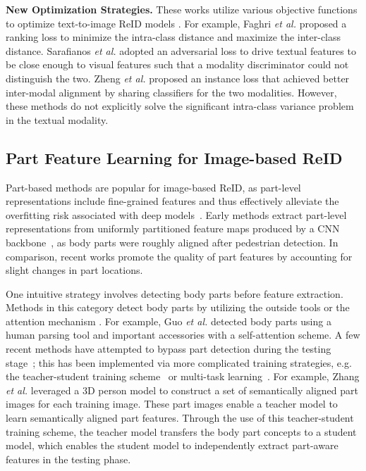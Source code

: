 \documentclass[journal]{IEEEtran}
\begin{document}
\textbf{New Optimization Strategies.} These works utilize various objective functions to optimize text-to-image ReID models \cite{li2017identity,faghri2017vse++,sarafianos2019adversarial,zhang2018deep,zheng2020dual,liu2019deep,ge2019visual}. For example, Faghri \emph{et al.} \cite{faghri2017vse++} proposed a ranking loss to minimize the intra-class distance and maximize the inter-class distance. Sarafianos \emph{et al.} \cite{sarafianos2019adversarial} adopted an adversarial loss to drive textual features to be close enough to visual features such that a modality discriminator could not distinguish the two. Zheng \emph{et al.} \cite{zheng2020dual} proposed an instance loss that achieved better inter-modal alignment by sharing classifiers for the two modalities. However, these methods do not explicitly solve the significant intra-class variance problem in the textual modality.

\subsection{Part Feature Learning for Image-based ReID}
Part-based methods are popular for image-based ReID, as part-level representations include fine-grained features and thus effectively alleviate the overfitting risk associated with deep models~\cite{yao2019deep,sun2018beyond}.
Early methods extract part-level representations from uniformly partitioned feature maps produced by a CNN backbone~\cite{sun2018beyond}, as body parts were roughly aligned after pedestrian detection. In comparison, recent works promote the quality of part features by accounting for slight changes in part locations.

One intuitive strategy involves detecting body parts before feature extraction.
Methods in this category detect body parts by utilizing the outside tools \cite{kalayeh2018human,su2017pose,zhao2017spindle,xu2018attention,zheng2019pose,guo2019beyond} or the attention mechanism \cite{zhao2017deeply,li2018harmonious,liu2017hydraplus,wang2018mancs,tay2019aanet}.
For example, Guo \emph{et al.} \cite{guo2019beyond} detected body parts using a human parsing tool \cite{ruan2019devil} and important accessories with a self-attention scheme.
A few recent methods have attempted to bypass part detection during the testing stage~\cite{ding2020multi,zhang2019densely}; this has been implemented via more complicated training strategies, e.g. the teacher-student training scheme~\cite{zhang2019densely,ren2018factorized} or multi-task learning~\cite{ding2020multi}. For example, Zhang \emph{et al.} \cite{zhang2019densely} leveraged a 3D person model to construct a set of semantically aligned part images for each training image.
These part images enable a teacher model to learn semantically aligned part features.
Through the use of this teacher-student training scheme, the teacher model transfers the body part concepts to a student model,
which enables the student model to independently extract part-aware features in the testing phase.
\end{document}
